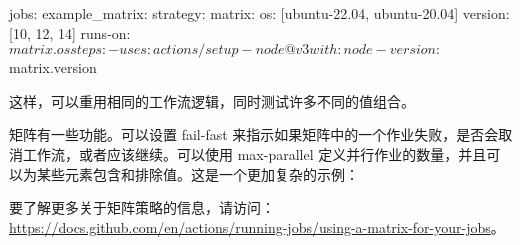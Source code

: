 \begin{shell}
jobs:
  example_matrix:
    strategy:
      matrix:
        os: [ubuntu-22.04, ubuntu-20.04]
        version: [10, 12, 14]
    runs-on: ${{ matrix.os }}
    steps:
      - uses: actions/setup-node@v3
      with:
        node-version: ${{ matrix.version }}
\end{shell}

这样，可以重用相同的工作流逻辑，同时测试许多不同的值组合。


矩阵有一些功能。可以设置 fail-fast 来指示如果矩阵中的一个作业失败，是否会取消工作流，或者应该继续。可以使用 max-parallel 定义并行作业的数量，并且可以为某些元素包含和排除值。这是一个更加复杂的示例：


要了解更多关于矩阵策略的信息，请访问：\url{https://docs.github.com/en/actions/running-jobs/using-a-matrix-for-your-jobs}。















